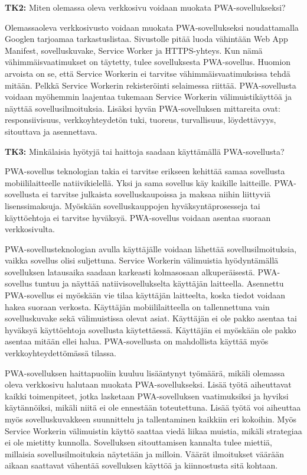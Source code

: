 \documentclass{tktltiki}
\begin{document}
\textbf{TK2:} Miten olemassa oleva verkkosivu voidaan muokata PWA-sovellukseksi?

Olemassaoleva verkkosivusto voidaan muokata PWA-sovellukseksi noudattamalla Googlen tarjoamaa tarkastuslistaa. Sivustolle pitää luoda vähintään Web App Manifest, sovelluskuvake, Service Worker ja HTTPS-yhteys. Kun nämä vähimmäisvaatimukset on täytetty, tulee sovelluksesta PWA-sovellus. Huomion arvoista on se, että Service Workerin ei tarvitse vähimmäisvaatimuksissa tehdä mitään. Pelkkä Service Workerin rekisteröinti selaimessa riittää. PWA-sovellusta voidaan myöhemmin laajentaa tukemaan Service Workerin välimuistikäyttöä ja näyttää sovellusilmoituksia. Lisäksi hyvän PWA-sovelluksen mittareita ovat: responsiivisuus, verkkoyhteydetön tuki, tuoreus, turvallisuus, löydettävyys, sitouttava ja asennettava.

\textbf{TK3:} Minkälaisia hyötyjä tai haittoja saadaan käyttämällä PWA-sovellusta?

PWA-sovellus teknologian takia ei tarvitse erikseen kehittää samaa sovellusta mobiililaitteelle natiivikielellä. Yksi ja sama sovellus käy kaikille laitteille. PWA-sovellusta ei tarvitse julkaista sovelluskaupoissa ja maksaa niihin liittyviä lisenssimaksuja. Myöskään sovelluskauppojen hyväksyntäprosesseja tai käyttöehtoja ei tarvitse hyväksyä. PWA-sovellus voidaan asentaa suoraan verkkosivulta. 

PWA-sovellusteknologian avulla käyttäjälle voidaan lähettää sovellusilmoituksia, vaikka sovellus olisi suljettuna. Service Workerin välimuistia hyödyntämällä sovelluksen latausaika saadaan karkeasti kolmasosaan alkuperäisestä. PWA-sovellus tuntuu ja näyttää natiivisovellukselta käyttäjän laitteella. Asennettu PWA-sovellus ei myöskään vie tilaa käyttäjän laitteelta, koska tiedot voidaan hakea suoraan verkosta. Käyttäjän mobiililaitteella on tallennettuna vain sovelluskuvake sekä välimuistissa olevat asiat. Käyttäjän ei ole pakko asentaa tai hyväksyä käyttöehtoja sovellusta käytettäessä. Käyttäjän ei myöskään ole pakko asentaa mitään ellei halua. PWA-sovellusta on mahdollista käyttää myös verkkoyhteydettömässä tilassa.

PWA-sovelluksen haittapuoliin kuuluu lisääntynyt työmäärä, mikäli olemassa oleva verkkosivu halutaan muokata PWA-sovellukseksi. Lisää työtä aiheuttavat kaikki toimenpiteet, jotka lasketaan PWA-sovelluksen vaatimuksiksi ja hyviksi käytännöiksi, mikäli niitä ei ole ennestään toteutettuna. Lisää työtä voi aiheuttaa myös sovelluskuvakkeen suunnittelu ja tallentaminen kaikkiin eri kokoihin. Myös Service Workerin välimuistin käyttö saattaa viedä liikaa muistia, mikäli strategiaa ei ole mietitty kunnolla. Sovelluksen sitouttamisen kannalta tulee miettiä, millaisia sovellusilmoituksia näytetään ja milloin. Väärät ilmoitukset väärään aikaan saattavat vähentää sovelluksen käyttöä ja kiinnostusta sitä kohtaan.





%
%


%

\clearpage


\lastpage

\appendices
\end{document}
